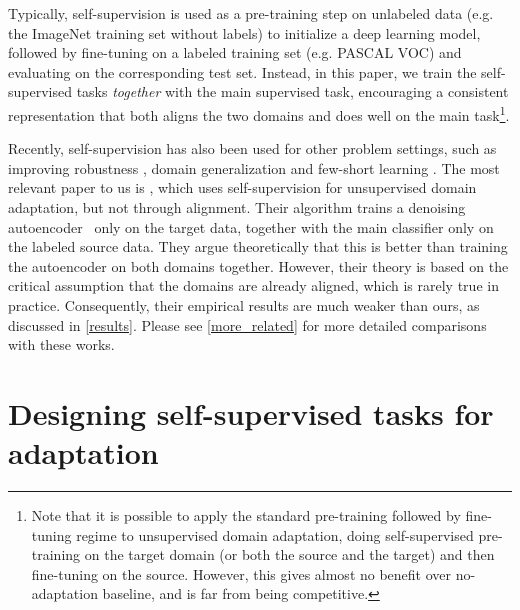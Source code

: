 \documentclass{article} \usepackage{iclr2020_conference,times}
\begin{document}
Typically, self-supervision is used as a pre-training step on unlabeled data (e.g. the ImageNet training set without labels) to initialize a deep learning model, followed by fine-tuning on a labeled training set (e.g. PASCAL VOC) and evaluating on the corresponding test set.  Instead, in this paper, we train the self-supervised tasks {\em together} with the main supervised task, encouraging a consistent representation that both aligns the two domains and does well on the main task\footnote{Note that it is possible to apply the standard pre-training followed by fine-tuning regime to unsupervised domain adaptation, doing self-supervised pre-training on the target domain (or both the source and the target) and then fine-tuning on the source.  However, this gives almost no benefit over no-adaptation baseline, and is far from being competitive.}.



Recently, self-supervision has also been used for other problem settings, such as improving robustness  \citep{hendrycks2019using}, domain generalization \citep{carlucci2019domain} and few-short learning \citep{su2019boosting}.  The most relevant paper to us is
\cite{ghifary2016deep}, which uses self-supervision for unsupervised domain adaptation, but not through alignment. 
Their algorithm trains a denoising autoencoder~\cite{vincent2008extracting} only on the target data, together with the main classifier only on the labeled source data.  They argue theoretically that this is better than training the autoencoder on both domains together.  However, their theory is based on the critical assumption that the domains are already aligned, which is rarely true in practice.  Consequently, their empirical results are much weaker than ours, as discussed in \autoref{results}.
Please see \autoref{more_related} for more detailed comparisons with these works. 
\section{Designing self-supervised tasks for adaptation}
\label{design}
\end{document}
